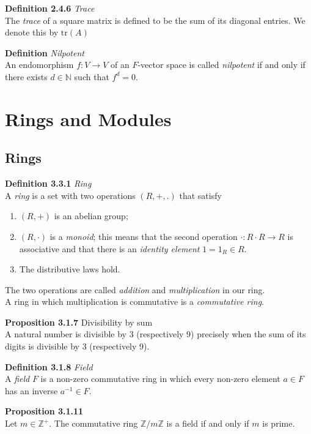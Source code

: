 \documentclass[8pt,landscape]{article}
\begin{document}
\begin{multicols}{3}
    \textbf{Definition 2.4.6} \emph{Trace} \\
    The \emph{trace} of a square matrix is defined to be the sum of its diagonal
    entries.
    We denote this by
    $\mathrm{tr}(A)$

    \textbf{Definition} \emph{Nilpotent} \\
    An endomorphism $f : V \to V$ of an $F$-vector space is called \emph{nilpotent}
    if and only if there exists $d \in \mathbb{N}$ such that $f^d = 0$.

    \section{Rings and Modules}

    \subsection{Rings}

    \textbf{Definition 3.3.1} \emph{Ring} \\
    A \emph{ring} is a set with two operations $(R,+,.)$ that satisfy
    \begin{enumerate}
        \item $(R,+)$ is an abelian group;
        \item $(R, \cdot)$ is a \emph{monoid}; this means that the second operation
            $\cdot : R \cdot R \to R$ is associative and that there is an
            \emph{identity element} $1=1_R \in R$.
        \item The distributive laws hold.
    \end{enumerate}
    The two operations are called \emph{addition} and \emph{multiplication} in our
    ring. \\
    A ring in which multiplication is commutative is a \emph{commutative ring}.

    \textbf{Proposition 3.1.7} Divisibility by sum \\
    A natural number is divisible by 3 (respectively 9) precisely when the sum of its
    digits is
    divisible by 3 (respectively 9).

    \textbf{Definition 3.1.8} \emph{Field} \\
    A \emph{field} $F$ is a non-zero commutative ring in which every non-zero element
    $a \in F$ has an inverse $a^{-1} \in F$.

    \textbf{Proposition 3.1.11} \\
    Let $m \in \mathbb{Z}^+$.
    The commutative ring $\mathbb{Z} / m\mathbb{Z}$ is a field if and only if $m$
    is prime.


\end{multicols}
\end{document}

